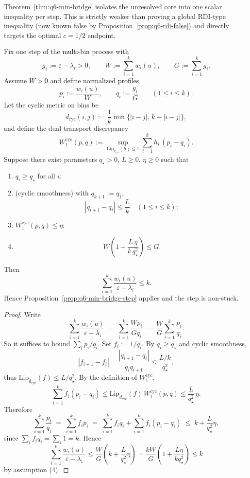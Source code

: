 \begin{remark}
Theorem~\ref{thm:q6-min-bridge} isolates the unresolved core into one
scalar inequality per step. This is strictly weaker than proving a global
RDI-type inequality (now known false by
Proposition~\ref{prop:q6-rdi-false}) and directly targets the optimal
$c=1/2$ endpoint.
\end{remark}

\begin{proposition}\label{prop:q6-omega-transport}
Fix one step of the multi-bin process with
\[
g_i:=\varepsilon-\lambda_i>0,\qquad
W:=\sum_{i=1}^k w_i(u),\qquad
G:=\sum_{i=1}^k g_i.
\]
Assume $W>0$ and define normalized profiles
\[
p_i:=\frac{w_i(u)}{W},\qquad q_i:=\frac{g_i}{G}\qquad (1\le i\le k).
\]
Let the cyclic metric on bins be
\[
d_{\mathrm{cyc}}(i,j):=\frac{1}{k}\min\{|i-j|,\,k-|i-j|\},
\]
and define the dual transport discrepancy
\[
W_1^{\mathrm{cyc}}(p,q):=
\sup_{\mathrm{Lip}_{d_{\mathrm{cyc}}}(h)\le 1}
\sum_{i=1}^k h_i\,(p_i-q_i).
\]
Suppose there exist parameters $q_\star>0$, $L\ge 0$, $\eta\ge 0$ such that
\begin{enumerate}[nosep]
\item $q_i\ge q_\star$ for all $i$;
\item (cyclic smoothness) with $q_{k+1}:=q_1$,
\[
|q_{i+1}-q_i|\le \frac{L}{k}\quad (1\le i\le k);
\]
\item $W_1^{\mathrm{cyc}}(p,q)\le \eta$;
\item
\[
W\left(1+\frac{L\,\eta}{k\,q_\star^2}\right)\le G.
\]
\end{enumerate}
Then
\[
\sum_{i=1}^k\frac{w_i(u)}{\varepsilon-\lambda_i}\le k.
\]
Hence Proposition~\ref{prop:q6-min-bridge-step} applies and the step is non-stuck.
\end{proposition}

\begin{proof}
Write
\[
\sum_{i=1}^k\frac{w_i(u)}{\varepsilon-\lambda_i}
\;=\;\sum_{i=1}^k\frac{W p_i}{G q_i}
\;=\;\frac{W}{G}\sum_{i=1}^k\frac{p_i}{q_i}.
\]
So it suffices to bound $\sum_i p_i/q_i$.
Set $f_i:=1/q_i$.
By $q_i\ge q_\star$ and cyclic smoothness,
\[
|f_{i+1}-f_i|
=\frac{|q_{i+1}-q_i|}{q_i q_{i+1}}
\le \frac{L/k}{q_\star^2},
\]
thus $\mathrm{Lip}_{d_{\mathrm{cyc}}}(f)\le L/q_\star^2$.
By the definition of $W_1^{\mathrm{cyc}}$,
\[
\sum_{i=1}^k f_i(p_i-q_i)
\le \mathrm{Lip}_{d_{\mathrm{cyc}}}(f)\,W_1^{\mathrm{cyc}}(p,q)
\le \frac{L}{q_\star^2}\,\eta.
\]
Therefore
\[
\sum_{i=1}^k \frac{p_i}{q_i}
\;=\;\sum_{i=1}^k f_i p_i
\;=\;\sum_{i=1}^k f_i q_i + \sum_{i=1}^k f_i(p_i-q_i)
\;\le\; k + \frac{L}{q_\star^2}\eta,
\]
since $\sum_i f_i q_i=\sum_i 1 = k$.
Hence
\[
\sum_{i=1}^k\frac{w_i(u)}{\varepsilon-\lambda_i}
\le
\frac{W}{G}\left(k+\frac{L}{q_\star^2}\eta\right)
=
\frac{kW}{G}\left(1+\frac{L\eta}{k q_\star^2}\right)
\le k
\]
by assumption (4).
\end{proof}

